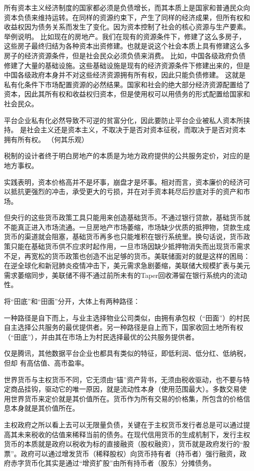 所有资本主义经济制度的国家都必须是负债增长，而其本质上是国家和普通民众向资本负债来维持运转。在同样的资源约束下，产生了同样的经济成果，但所有权和收益权因为债务关系而发生了变化。因为资本控制了社会的核心资源与生产要素。
举例说明。
比如现在的房地产。我们在现有的资源条件下，修建了这么多房子，这些房子最终归结为各种资本出资修建。也就是说这个社会本质上具有修建这么多房子的经济资源条件，但是社会民众必须负债来消费。
比如，中国各级政府负债修建了大量的基础设施。这些基础设施是现有的经济资源条件下修建出来的，但是中国各级政府本身并不对这些经济资源拥有所有权，因此只能负债修建。
这就是私有化条件下市场配置资源的必然结果。国家和社会的绝大部分经济资源配置给了资本，因此其所有权和收益权归资本，但是使用权可以用债务的形式配置给国家和社会民众。

平台企业私有化必然导致不可逆的贫富分化，因此要防止平台企业被私人资本所挟持。
是社会主义还是资本主义，不取决于是否对资本征税，而取决于是否对资本拥有所有权。
（何其乐观）

税制的设计者终于明白房地产的本质是为地方政府提供的公共服务定价，对应的是地方事权。

实践表明，资本价格高并不是坏事，崩盘才是坏事。相对而言，资本廉价的经济可以抵抗更强烈的冲击，承受更大的亏损，并在对手资本耗尽后抄底对手的资产和市场。

但央行的这些货币政策工具只能用来创造基础货币。不通过银行贷款，基础货币就不能真正进入市场流通。一旦房地产市场萎缩，市场缺少优质的抵押物，贷款生成货币的渠道就会阻塞，基础货币再多也只能堆积在银行系统里。换句话说，货币政策只能在基础货币供不应求时起作用，一旦市场因缺少抵押物消失而出现货币需求不足，再宽松的货币政策也创造不出足够的货币。美联储面对的就是这样的困局：在逆全球化和新冠肺炎疫情冲击下，美元需求急剧萎缩，美联储大规模扩表与美元需求萎缩同步，美联储不得不通过前所未有的Taper回收滞留在银行系统内的流动性。

将“田底”和“田面”分开，大体上有两种路径：

一种路径是自下而上，与业主选择物业公司类似，由拥有承包权（“田面”）的村民自主选择公共服务的最优提供者。另一种路径是自上而下，国家收回土地所有权（“田底”），并由其在市场上为村民选择最优的公共服务提供者。

仅是腾讯，其他数据平台企业也都具有类似的特征，即低利润、低分红、低纳税，但却
有高估值、高市盈率。

世界货币与主权货币不同，它无须由“锚”资产背书，无须由税收驱动，也不要与特定商品挂钩，驱动它的唯一原因，就是流动性本身（使用范围最大）。多数交易使用世界货币来定价就是其价值所在。货币作为所有交易的价格集，所包含的价格信息本身就是其价值所在。

主权政府之所以看上去可以无限量负债，关键在于主权货币发行者总是可以通过提高其未来税收的估值来稀释当前的债务。在现代信用货币的生成机制下，发行主权货币的本质就是政府以税收为标的直接融资（股权融资），货币就是政府发行的“股票”。政府可以通过增发货币（稀释股权）向货币持有者（持币者）强行融资，政府赤字货币化其实是通过“增资扩股”由所有持币者（股东）分摊债务。




